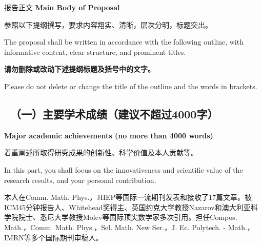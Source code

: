 \documentclass[12pt,UTF8,AutoFakeBold=4,a4paper]{ctexart}
\begin{document}
\begin{center}
{\sanhao {} 报告正文 
\bfseries {} Main Body of Proposal}
\end{center}

{\sihao \kaishu  
参照以下提纲撰写，要求内容翔实、清晰，层次分明，标题突出。}

\bigskip

{\sihao {} The proposal shall be written in accordance with the following outline, with informative content, clear structure, and prominent titles.}

\bigskip

{\sihao \kaishu \color{MsBlue} \bfseries 请勿删除或改动下述提纲标题及括号中的文字。}

\bigskip

{\sihao \color{MsBlue}  Please do not delete or change the title of the outline and the words in brackets.}



{\color{MsBlue} \subsection{\sihao \kaishu \qquad \ 
\textbf{（一）主要学术成绩}{\normalfont（建议不超过4000字）}}}


{\color{MsBlue} \xiaosihao {} 
\textbf{Major academic achievements (no more than 4000 words)}}

\medskip

{\sihao \kaishu \color{MsBlue} 着重阐述所取得研究成果的创新性、科学价值及本人贡献等。}

\medskip

{\color{MsBlue} \xiaosihao {} In this part, you shall focus on the innovativeness and scientific value of the research results, and your personal contribution.}

% 
% 


本人在Comm. Math. Phys.，JHEP等国际一流期刊发表和接收了17篇文章。被ICM45分钟报告人、Whitehead奖得主、英国约克大学教授Nazarov和澳大利亚科学院院士、悉尼大学教授Molev等国际顶尖数学家多次引用。担任Compos. Math.，Comm. Math. Phys.，Sel. Math. New Ser.，J. Ec. Polytech. - Math.，IMRN等多个国际期刊审稿人。
\end{document}
